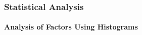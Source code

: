 \subsubsection{Statistical Analysis}\label{ftml-conf:sec:results:stats}
\paragraph{Analysis of Factors Using Histograms}


